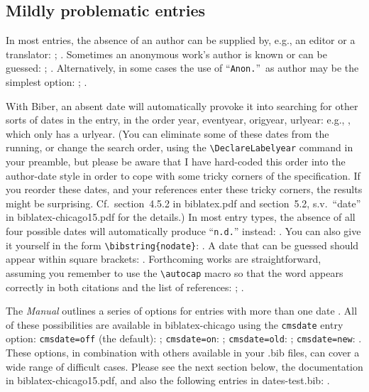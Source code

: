 \documentclass[a4paper,12pt]{report}
\newcommand{\cmd}[1]{\texttt{\textbackslash #1}}
\begin{document}
\subsection*{Mildly problematic entries}
\label{sec:problematic}

In most entries, the absence of an author can be supplied by, e.g., an
editor or a translator: \autocite{chaucer:alt};
\autocite{silver:gawain}.  Sometimes an anonymous work's author is
known or can be guessed: \autocite{horsley:prosodies};
\autocite{cook:sotweed}.  Alternatively, in some cases the use of
\enquote{\texttt{Anon.}}\ as author may be the simplest option:
\autocite{anon:stanze:15}; \autocite{virginia:plantation:15}.

With \textsf{Biber}, an absent \textsf{date} will automatically
provoke it into searching for other sorts of dates in the entry, in
the order \textsf{year, eventyear, origyear, urlyear}: e.g.,
\autocite{evanston:library}, which only has a \textsf{urlyear}.  (You
can eliminate some of these dates from the running, or change the
search order, using the \cmd{DeclareLabelyear} command in your
preamble, but please be aware that I have hard-coded this order into
the author-date style in order to cope with some tricky corners of the
specification.  If you reorder these dates, and your references enter
these tricky corners, the results might be surprising.  Cf.\
section~4.5.2 in \textsf{biblatex.pdf} and section~5.2, s.v.\
\enquote{date} in \textsf{biblatex-chicago15.pdf} for the details.)
In most entry types, the absence of all four possible dates will
automatically produce \enquote{\texttt{n.d.}\hspace{-2pt}} instead:
\autocite{bernstein:shostakovich}.  You can also give it yourself in
the form \cmd{bibstring\{nodate\}}: \autocite{ross:thesis}.  A date
that can be guessed should appear within square brackets:
\autocite{clark:mesopot}.  Forthcoming works are straightforward,
assuming you remember to use the \cmd{autocap} macro so that the word
appears correctly in both citations and the list of references:
\autocite{author:forthcoming}; \autocite{contrib:contrib}.

The \emph{Manual} outlines a series of options for entries with more
than one date \autocite[17.124--27]{chicago:manual:15}.  All of these
possibilities are available in \textsf{biblatex-chicago} using the
\texttt{cmsdate} entry option: \texttt{cmsdate=off} (the default):
\autocite{maitland:equity}; \texttt{cmsdate=on}:
\autocite{james:ambassadors}; \texttt{cmsdate=old}:
\autocite{emerson:nature}; \texttt{cmsdate=new}:
\autocite{maitland:canon}.  These options, in combination with others
available in your .bib files, can cover a wide range of difficult
cases.  Please see the next section below, the documentation in
\textsf{biblatex-chicago15.pdf}, and also the following entries in
\textsf{dates-test.bib}:
\autocites{schweitzer:bach}{white:russ}{white:ross:memo}.
\end{document}
